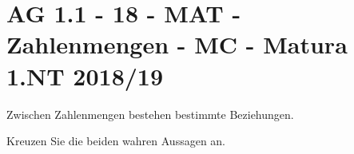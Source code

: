 \section{AG 1.1 - 18 - MAT - Zahlenmengen - MC - Matura 1.NT 2018/19}

\begin{beispiel}[AG 1.1]{1}
Zwischen Zahlenmengen bestehen bestimmte Beziehungen.

Kreuzen Sie die beiden wahren Aussagen an.

\end{beispiel}